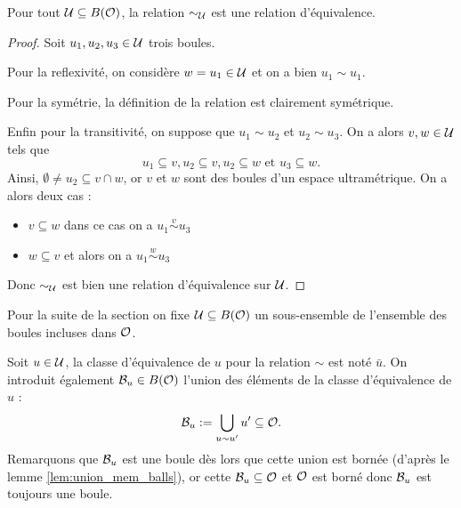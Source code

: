 \documentclass[../../rapport.tex]{subfiles}
\begin{document}
  \begin{proposition}
    Pour tout $\mathcal U \subseteq B(\mathcal{O})$, la relation $\sim_{\mathcal U}$ est une relation d'équivalence.
  \end{proposition}

  \begin{proof}
    Soit $u_1, u_2, u_3 \in \mathcal U$ trois boules.

    Pour la reflexivité, on considère $w = u_1 \in \mathcal U$ et on a bien $u_1 \sim u_1$.

    Pour la symétrie, la définition de la relation est clairement symétrique.

    Enfin pour la transitivité, on suppose que $u_1 \sim u_2$ et $u_2 \sim u_3$.
    On a alors $v, w \in \mathcal U$ tels que
    $$u_1 \subseteq v, u_2 \subseteq v, u_2 \subseteq w \text{ et } u_3 \subseteq w.$$
    Ainsi, $\emptyset \not= u_2 \subseteq v \cap w$, or $v$ et $w$ sont des boules d'un espace ultramétrique. On a alors deux cas :
    \begin{itemize}
      \item $v \subseteq w$ dans ce cas on a $u_1 \stackrel{v}{\sim} u_3$
      \item $w \subseteq v$ et alors on a $u_1 \stackrel{w}{\sim} u_3$
    \end{itemize}
    \begin{figure}[ht]
      \centering
	\hspace{1.5cm}

  \end{figure}
  Donc $\sim_{\mathcal U}$ est bien une relation d'équivalence sur $\mathcal U$.
  \end{proof}

  Pour la suite de la section on fixe $\mathcal U \subseteq B(\mathcal{O})$ un sous-ensemble de l'ensemble des boules incluses dans $\mathcal{O}$.

  \begin{definition}
    Soit $u \in \mathcal U$, la classe d'équivalence de $u$ pour la relation $\sim$ est noté $\bar{u}$.
    On introduit également $\mathcal{B}_u \in B(\mathcal{O})$ l'union des éléments de la classe d'équivalence de $u$ :
    $$\mathcal{B}_u := \bigcup_{u \sim u'}{u'} \subseteq \mathcal{O}.$$
    Remarquons que $\mathcal{B}_u$ est une boule dès lors que cette union est bornée (d'après le lemme \ref{lem:union_mem_balls}),
    or cette $\mathcal{B}_u \subseteq \mathcal{O}$ et $\mathcal{O}$ est borné donc $\mathcal{B}_u$ est toujours une boule.
  \end{definition}
\end{document}
